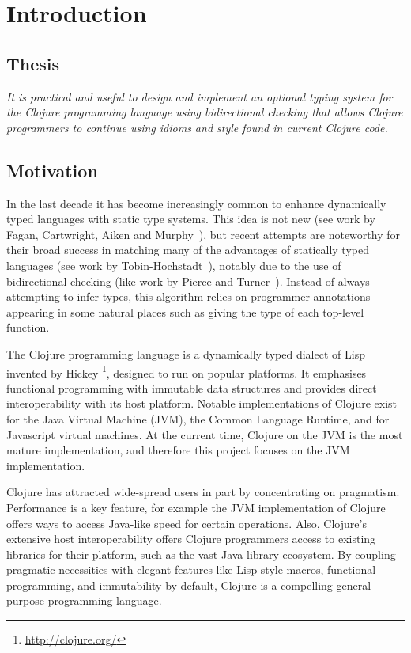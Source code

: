 \chapter{Introduction}

\section{Thesis}

\emph{It is practical and useful to design and implement an optional typing system 
for the Clojure programming language using bidirectional checking that allows Clojure programmers to continue 
using idioms and style found in current Clojure code.}

\section{Motivation}

In the last decade it has become increasingly common to enhance
dynamically typed languages with static type systems. 
This idea is not new (see work by Fagan, Cartwright, Aiken and Murphy~\cite{Fag91,CF91,AM91}), but recent attempts
are noteworthy for their broad success in matching many of the advantages of statically typed
languages (see work by Tobin-Hochstadt~\cite{Tob10}), 
notably due to the use of bidirectional checking (like work by Pierce and Turner~\cite{PT00}).
Instead of always attempting to infer types, this algorithm relies on programmer annotations
appearing in some natural places such as giving the type of each top-level function.

The Clojure programming language is a dynamically typed dialect of Lisp invented
by Hickey \footnote{\url{http://clojure.org/}}, designed to run on popular platforms.
It emphasises functional programming with immutable data structures
and provides direct interoperability with its host platform.
Notable implementations of Clojure exist for the Java Virtual Machine (JVM),
the Common Language Runtime, and for Javascript virtual machines.
At the current time, Clojure on the JVM is the most mature implementation,
and therefore this project focuses on the JVM implementation.

Clojure has attracted wide-spread users in part by concentrating on pragmatism.
Performance is a key feature, for example the JVM implementation of Clojure
offers ways to access Java-like speed for certain operations.
Also, Clojure's extensive host interoperability offers Clojure programmers
access to existing libraries for their platform, such as the vast Java library ecosystem.
By coupling pragmatic necessities with elegant features like Lisp-style macros, functional programming,
and immutability by default, Clojure is a compelling general purpose programming language.

